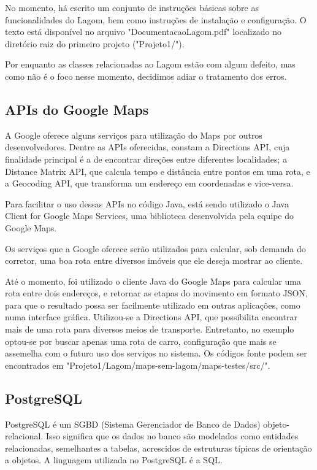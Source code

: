 \documentclass[a4paper,11pt,fleqn]{article}
\begin{document}
No momento, há escrito um conjunto de instruções básicas sobre as funcionalidades do Lagom, bem como instruções de instalação e configuração.
 O texto está disponível no arquivo "DocumentacaoLagom.pdf" localizado no diretório raiz do primeiro projeto ("Projeto1/").

Por enquanto as classes relacionadas ao Lagom estão com algum defeito, mas como não é o foco nesse momento, decidimos adiar o tratamento dos erros.

\subsection{APIs do Google Maps}
\label{ss:maps}

A Google oferece alguns serviços para utilização do Maps por outros desenvolvedores. Dentre as APIs oferecidas, constam a Directions API,
 cuja finalidade principal é a de encontrar direções entre diferentes localidades; a Distance Matrix API, que calcula tempo e distância entre
  pontos em uma rota, e a Geocoding API, que transforma um endereço em coordenadas e vice-versa.

Para facilitar o uso dessas APIs no código Java, está sendo utilizado o Java Client for Google Maps Services, uma biblioteca desenvolvida pela equipe do
 Google Maps.

Os serviços que a Google oferece serão utilizados para calcular, sob demanda do corretor, uma boa rota entre diversos imóveis que ele deseja mostrar ao
 cliente.

 Até o momento, foi utilizado o cliente Java do Google Maps para calcular uma rota entre dois endereços, e retornar as etapas do movimento em formato
  JSON, para que o resultado possa ser facilmente utilizado em outras aplicações, como numa interface gráfica. Utilizou-se a Directions API, que possibilita
   encontrar mais de uma rota para diversos meios de transporte. Entretanto, no exemplo optou-se por buscar apenas uma rota de carro, configuração que mais se assemelha
    com o futuro uso dos serviços no sistema. Os códigos fonte podem ser encontrados em "Projeto1/Lagom/maps-sem-lagom/maps-testes/src/".

\subsection{PostgreSQL}
\label{ss:postgre}

PostgreSQL é um SGBD (Sistema Gerenciador de Banco de Dados) objeto-relacional. Isso significa que os dados no banco são modelados como entidades relacionadas, semelhantes
 a tabelas, acrescidos de estruturas típicas de orientação a objetos. A linguagem utilizada no PostgreSQL é a SQL.
\end{document}
